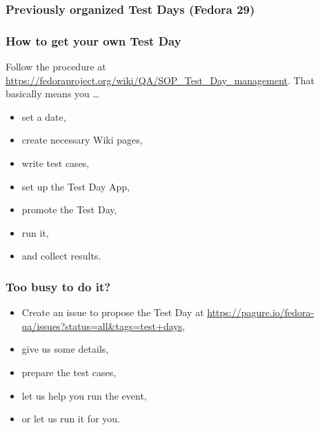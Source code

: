 \documentclass[12pt]{beamer}
\begin{document}
\begin{frame}
\frametitle{Previously organized Test Days (Fedora 29)}

\end{frame}

\begin{frame}
\frametitle{How to get your own Test Day}
Follow the procedure at {\color{blue}\url{https://fedoraproject.org/wiki/QA/SOP_Test_Day_management}}. That basically means you \ldots{}
\begin{itemize}
		\item set a date,
		\item create necessary Wiki pages,
		\item write test cases,
		\item set up the Test Day App,
		\item promote the Test Day,
		\item run it,
		\item and collect results.
\end{itemize}
\end{frame}

\begin{frame}
\frametitle{Too busy to do it?}

\begin{itemize}
	\item Create an issue to propose the Test Day at {\color{blue}\url{https://pagure.io/fedora-qa/issues?status=all&tags=test+days}},
	\item give us some details,
	\item prepare the test cases,
	\item let us help you run the event,
	\item or let us run it for you.
\end{itemize}

\end{frame}
\end{document}
